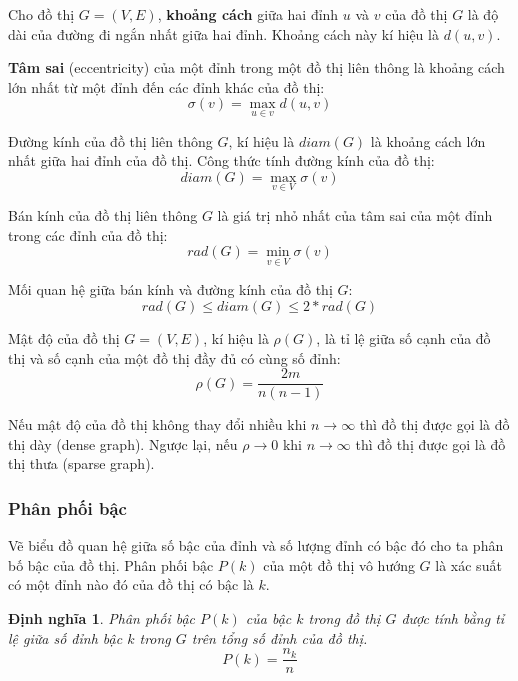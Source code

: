 \documentclass[14pt, oneside, a4paper, openany]{scrartcl}
\newtheorem{definition}{Định nghĩa}[section]
\begin{document}
\cite{graphtextbook} Cho đồ thị $G=(V,E)$, \textbf{khoảng cách}  giữa hai đỉnh $u$ và $v$ của đồ thị $G$ là độ dài của đường đi ngắn nhất giữa hai đỉnh. Khoảng cách này kí hiệu là $d(u,v)$.

\cite{graphtextbook} \textbf{Tâm sai}  (eccentricity) của một đỉnh trong một đồ thị liên thông là khoảng cách lớn nhất từ một đỉnh đến các đỉnh khác của đồ thị:
\begin{equation}
	\sigma(v) = \max_{u \in v} d(u,v)
\end{equation}

\cite{graphtextbook} Đường kính của đồ thị liên thông $G$, kí hiệu là $diam(G)$ là khoảng cách lớn nhất giữa hai đỉnh của đồ thị. Công thức tính đường kính của đồ thị:
\begin{equation}
	diam(G) = \max_{v \in V} \sigma(v)
\end{equation}

\cite{graphtextbook} Bán kính của đồ thị liên thông $G$ là giá trị nhỏ nhất của tâm sai của một đỉnh trong các đỉnh của đồ thị:
\begin{equation}
	rad(G) = \min_{v \in V} \sigma(v)
\end{equation}

\cite{graphtextbook} Mối quan hệ giữa bán kính và đường kính của đồ thị $G$:
\begin{equation}
	rad(G) \leq diam(G) \leq 2 * rad(G)
\end{equation}

\cite{complexnetwork} Mật độ của đồ thị $G=(V,E)$, kí hiệu là $\rho(G)$, là tỉ lệ giữa số cạnh của đồ thị và số cạnh của một đồ thị đầy đủ có cùng số đỉnh:
\begin{equation}
	\rho(G) = \frac{2m}{n(n-1)}
\end{equation}

Nếu mật độ của đồ thị không thay đổi nhiều khi $n \rightarrow \infty$ thì đồ thị được gọi là đồ thị dày (dense graph). Ngược lại, nếu $\rho \rightarrow 0$ khi $n \rightarrow \infty$ thì đồ thị được gọi là đồ thị thưa (sparse graph).

\subsubsection{Phân phối bậc}
Vẽ biểu đồ quan hệ giữa số bậc của đỉnh và số lượng đỉnh có bậc đó cho ta phân bố bậc của đồ thị. Phân phối bậc $P(k)$ của một đồ thị vô hướng $G$ là xác suất có một đỉnh nào đó của đồ thị có bậc là $k$.
\begin{definition}
	Phân phối bậc $P(k)$ của bậc $k$ trong đồ thị $G$ được tính bằng tỉ lệ giữa số đỉnh bậc $k$ trong $G$ trên tổng số đỉnh của đồ thị.
	\begin{equation}
		P(k) = \frac{n_k}{n}
	\end{equation}
\end{definition}
\end{document}
